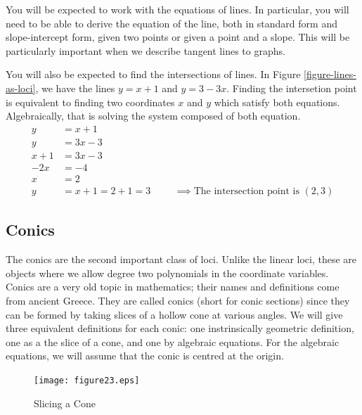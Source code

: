 \documentclass[fleqn]{report}
\begin{document}
You will be expected to work with the equations of lines. In
particular, you will need to be able to derive the equation of
the line, both in standard form and slope-intercept form,
given two points or given a point and a slope. This will be
particularly important when we describe tangent lines to
graphs.

You will also be expected to find the intersections of lines.
In Figure \ref{figure-lines-as-loci}, we have the lines
$y=x+1$ and $y=3-3x$. Finding the intersetion point is
equivalent to finding two coordinates $x$ and $y$ which
satisfy both equations. Algebraically, that is solving the
system composed of both equation.
\begin{align*}
y & = x+1 \\
y & = 3x-3 \\
x+1 & = 3x-3 \\
-2x & = -4 \\
x & = 2 \\
y & = x+1 = 2+1 = 3 \hspace{1cm} \implies \text{The
intersection point is $(2,3)$}
\end{align*}

\subsection{Conics}
\label{conics}

The conics are the second important class of loci. Unlike
the linear loci, these are objects where we allow degree two
polynomials in the coordinate variables. Conics are a very
old topic in mathematics; their names and definitions come
from ancient Greece. They are called conics (short for conic
sections) since they can be formed by taking slices of a
hollow cone at various angles. We will give three equivalent
definitions for each conic: one instrinsically geometric
definition, one as a the slice of a cone, and one by algebraic
equations. For the algebraic equations, we will assume that
the conic is centred at the origin.

\begin{figure}[ht]
\centering
\texttt{[image: figure23.eps]}
\caption{Slicing a Cone}
\label{figure-slicing-a-cone}
\end{figure}
\end{document}
